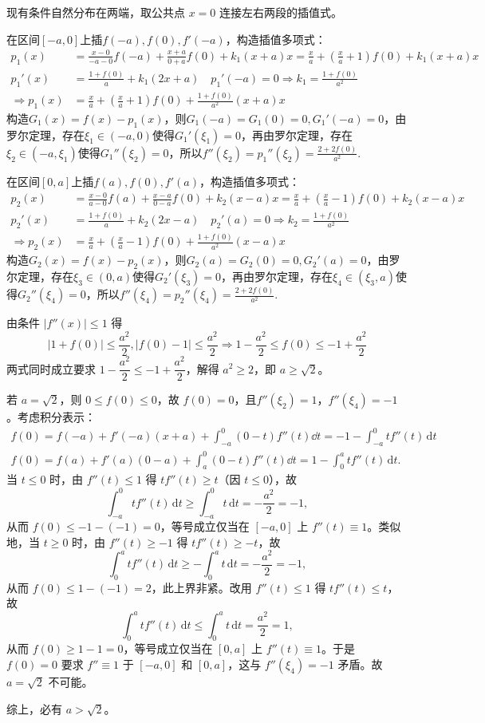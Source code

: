 \begin{solution}
    现有条件自然分布在两端，取公共点 $x=0$ 连接左右两段的插值式。

在区间$[-a,0]$上插$f(-a),f(0),f'(-a)$，构造插值多项式：
\begin{align*}
    p_1(x)&=\frac{x-0}{-a-0}f(-a)+\frac{x+a}{0+a}f(0)+k_1(x+a)x=\frac{x}{a}+(\frac{x}{a}+1)f(0)+k_1(x+a)x\\
    p_1'(x)&=\frac{1+f(0)}{a}+k_1(2x+a)\quad p_1'(-a)=0\Rightarrow k_1=\frac{1+f(0)}{a^2}\\
    \Rightarrow p_1(x)&=\frac{x}{a}+(\frac{x}{a}+1)f(0)+\frac{1+f(0)}{a^2}(x+a)x
\end{align*}
构造$G_1(x)=f(x)-p_1(x)$，则$G_1(-a)=G_1(0)=0,G_1'(-a)=0$，由罗尔定理，存在$\xi_1\in(-a,0)$使得$G_1'(\xi_1)=0$，再由罗尔定理，存在$\xi_2\in(-a,\xi_1)$使得$G_1''(\xi_2)=0$，所以$f''(\xi_2)=p_1''(\xi_2)=\frac{2+2f(0)}{a^2}$.

在区间$[0,a]$上插$f(a),f(0),f'(a)$，构造插值多项式：
\begin{align*}
    p_2(x)&=\frac{x-0}{a-0}f(a)+\frac{x-a}{0-a}f(0)+k_2(x-a)x=\frac{x}{a}+(\frac{x}{a}-1)f(0)+k_2(x-a)x\\
    p_2'(x)&=\frac{1+f(0)}{a}+k_2(2x-a)\quad p_2'(a)=0\Rightarrow k_2=\frac{1+f(0)}{a^2}\\
    \Rightarrow p_2(x)&=\frac{x}{a}+(\frac{x}{a}-1)f(0)+\frac{1+f(0)}{a^2}(x-a)x
\end{align*}
构造$G_2(x)=f(x)-p_2(x)$，则$G_2(a)=G_2(0)=0,G_2'(a)=0$，由罗尔定理，存在$\xi_3\in(0,a)$使得$G_2'(\xi_3)=0$，再由罗尔定理，存在$\xi_4\in(\xi_3,a)$使得$G_2''(\xi_4)=0$，所以$f''(\xi_4)=p_2''(\xi_4)=\frac{2+2f(0)}{a^2}$.

由条件 $|f''(x)|\leqslant 1$ 得
\[
|1+f(0)|\le\frac{a^2}{2},|f(0)-1|\le\frac{a^2}{2}\Rightarrow 1-\frac{a^2}{2}\le f(0)\le -1+\frac{a^2}{2}
\]
两式同时成立要求 $1-\dfrac{a^2}{2}\le -1+\dfrac{a^2}{2}$，解得 $a^2\ge 2$，即 $a\ge\sqrt2$。

若 $a=\sqrt2$，则 $0\le f(0)\le 0$，故 $f(0)=0$，且$f''(\xi_2)=1$，$f''(\xi_4)=-1$。考虑积分表示：
\begin{align*}
f(0)=f(-a)+f'(-a)(x+a)+\int_{-a}^0(0-t)f''(t)\dd t=-1-\int_{-a}^{0}t f''(t)\,\mathrm{d}t\\
f(0)=f(a)+f'(a)(0-a)+\int_{a}^0(0-t)f''(t)\dd t=1-\int_{0}^{a}t f''(t)\,\mathrm{d}t.
\end{align*}
当 $t\le 0$ 时，由 $f''(t)\le 1$ 得 $t f''(t)\ge t$（因 $t\le 0$），故
\[
\int_{-a}^{0}t f''(t)\,\mathrm{d}t\ge\int_{-a}^{0}t\,\mathrm{d}t=-\frac{a^2}{2}=-1,
\]
从而 $f(0)\le -1-(-1)=0$，等号成立仅当在 $[-a,0]$ 上 $f''(t)\equiv 1$。类似地，当 $t\ge 0$ 时，由 $f''(t)\ge -1$ 得 $t f''(t)\ge -t$，故
\[
\int_{0}^{a}t f''(t)\,\mathrm{d}t\ge -\int_{0}^{a}t\,\mathrm{d}t=-\frac{a^2}{2}=-1,
\]
从而 $f(0)\le 1-(-1)=2$，此上界非紧。改用 $f''(t)\le 1$ 得 $t f''(t)\le t$，故
\[
\int_{0}^{a}t f''(t)\,\mathrm{d}t\le\int_{0}^{a}t\,\mathrm{d}t=\frac{a^2}{2}=1,
\]
从而 $f(0)\ge 1-1=0$，等号成立仅当在 $[0,a]$ 上 $f''(t)\equiv 1$。于是 $f(0)=0$ 要求 $f''\equiv 1$ 于 $[-a,0]$ 和 $[0,a]$，这与 $f''(\xi_4)=-1$ 矛盾。故 $a=\sqrt2$ 不可能。

综上，必有 $a>\sqrt2$。
\end{solution}

